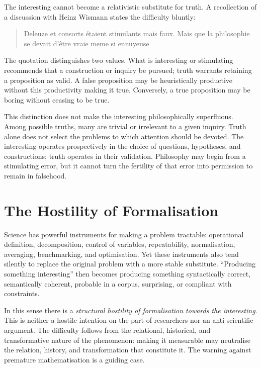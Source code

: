 \documentclass[11pt,a4paper]{article}
\begin{document}
The interesting cannot become a relativistic substitute for truth. A
recollection of a discussion with Heinz Wismann states the difficulty bluntly:

\begin{quote}
Deleuze et consorts étaient stimulants mais faux. Mais que la philosophie se
devait d'être vraie meme si ennuyeuse
\end{quote}

The quotation distinguishes two values. What is interesting or stimulating
recommends that a construction or inquiry be pursued; truth warrants retaining
a proposition as valid. A false proposition may be heuristically productive
without this productivity making it true. Conversely, a true proposition may
be boring without ceasing to be true.

This distinction does not make the interesting philosophically superfluous.
Among possible truths, many are trivial or irrelevant to a given inquiry. Truth
alone does not select the problems to which attention should be devoted. The
interesting operates prospectively in the choice of questions, hypotheses, and
constructions; truth operates in their validation. Philosophy may begin from a
stimulating error, but it cannot turn the fertility of that error into
permission to remain in falsehood.

\section{The Hostility of Formalisation}

Science has powerful instruments for making a problem tractable: operational
definition, decomposition, control of variables, repeatability, normalisation,
averaging, benchmarking, and optimisation. Yet these instruments also tend
silently to replace the original problem with a more stable substitute.
``Producing something interesting'' then becomes producing something
syntactically correct, semantically coherent, probable in a corpus, surprising,
or compliant with constraints.

In this sense there is a \emph{structural hostility of formalisation towards the
interesting}. This is neither a hostile intention on the part of researchers nor
an anti-scientific argument. The difficulty follows from the relational,
historical, and transformative nature of the phenomenon: making it measurable
may neutralise the relation, history, and transformation that constitute it.
The warning against premature mathematisation
\parencite{russell1995rationality,russell1995awardlecture} is a guiding case.
\end{document}
